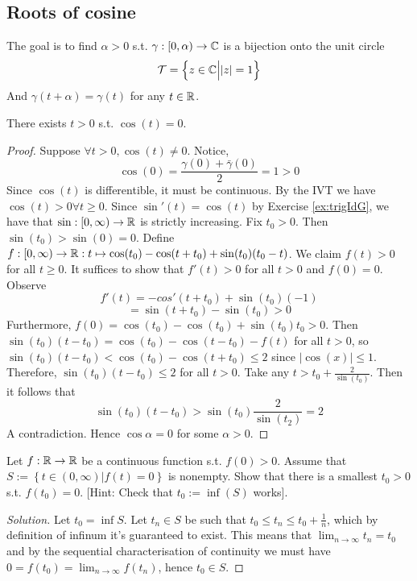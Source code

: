 \subsection{Roots of cosine}
The goal is to find $\alpha>0$ s.t. $\gamma:[0,\alpha)\to\mathbb C$ is a bijection onto the unit
circle
\[\mathcal T = \left\{ z\in\mathbb C \Big| |z|=1 \right\}\]
And $\gamma(t+\alpha)=\gamma(t)$ for any $t\in\mathbb R$.
\begin{theorem} 
    There exists $t>0$ s.t. $\cos(t)=0$.
    \label{thm:rootCos}
\end{theorem}
\begin{proof}
    Suppose $\forall t>0, \cos(t)\neq 0$. Notice,
\[\cos(0)=\frac{\gamma(0)+\bar{\gamma}(0)}{2}= 1>0\]
Since $\cos(t)$ is differentible, it must be continuous. By the IVT we have
$\cos(t)>0\forall t\geq0$. Since $\sin'(t)=\cos(t)$ by Exercise \ref{ex:trigIdG}, we have
that $\sin:[0,\infty)\to\mathbb R$ is strictly increasing. Fix $t_0>0$. Then
$\sin(t_0)>\sin(0)=0$. Define $f:[0,\infty)\to\mathbb R:t\mapsto
\cos(t_0)-\cos(t+t_0)+\sin(t_0)(t_0-t)$. We claim $f(t)>0$ for all $t\geq 0$. It suffices
to show that $f'(t)>0$ for all $t>0$ and $f(0)=0$. Observe
\[f'(t)= -cos'(t+t_0) + \sin(t_0)(-1)\]
\[=\sin(t+t_0) - \sin(t_0)>0\]
Furthermore, $f(0)=\cos(t_0)-\cos(t_0)+\sin(t_0)t_0>0$.
Then $\sin(t_0)(t-t_0)=\cos(t_0)-\cos(t-t_0)-f(t)$ for all $t>0$, so
$\sin(t_0)(t-t_0)<\cos(t_0)-\cos(t+t_0)\leq 2$ since $|\cos(x)|\leq 1$.
Therefore, $\sin(t_0)(t-t_0)\leq 2$ for all $t>0$. Take any $t>t_0+\frac{2}{\sin(t_0)}$.
Then it follows that
\[\sin(t_0)(t-t_0)>\sin(t_0)\frac{2}{\sin(t_2)} = 2\]
A contradiction. Hence $\cos\alpha =0$ for some $\alpha>0$.
\end{proof}

\begin{exercise}
    Let $f:\mathbb R\to\mathbb R$ be a continuous function s.t. $f(0)>0$. Assume that $S:=\left\{
    t\in(0,\infty) \Big| f(t)=0 \right\}$ is nonempty. Show that there is a smallest
    $t_0>0$ s.t. $f(t_0)=0$.
    [Hint: Check that $t_0:=\inf(S)$ works].
\end{exercise}
\begin{proof}[Solution]
    Let $t_0=\inf S$. Let $t_n\in S$ be such that $t_0\leq t_n \leq
    t_0+\frac{1}{n}$, which by definition of infinum it's guaranteed to exist. This means
    that $\lim_{n\to \infty} t_n=t_0$ and by the sequential characterisation of continuity
    we must have $0=f(t_0)=\lim_{n\to\infty}f(t_n)$, hence $t_0\in S$. 
\end{proof}

